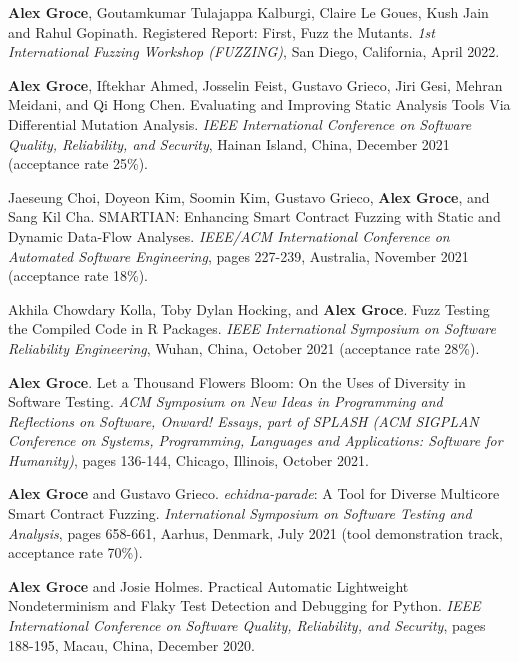 \documentclass[ComputerScience]{vita}
\begin{document}
\begin{vita}
\begin{Refereed Conference and Workshop Publications}
\item {\bf Alex Groce}, Goutamkumar
  Tulajappa Kalburgi, Claire Le Goues, Kush Jain and Rahul Gopinath.
  \newblock Registered Report: First, Fuzz the Mutants.
  \newblock \emph{1st International Fuzzing Workshop (FUZZING)}, San Diego, California, April 2022.

\item {\bf Alex Groce}, Iftekhar Ahmed, Josselin Feist, Gustavo
  Grieco, Jiri Gesi, Mehran Meidani, and Qi Hong Chen.
  \newblock Evaluating and Improving Static Analysis Tools Via
  Differential Mutation Analysis.
  \newblock \emph{IEEE International Conference on Software
Quality, Reliability, and Security}, Hainan
Island, China, December 2021 (acceptance rate 25\%).
  
\item Jaeseung Choi, Doyeon Kim, Soomin Kim, Gustavo Grieco, {\bf Alex Groce}, and Sang Kil Cha.
\newblock SMARTIAN: Enhancing Smart Contract Fuzzing with Static and Dynamic Data-Flow Analyses.
\newblock \emph{IEEE/ACM International Conference on Automated Software
  Engineering}, pages 227-239, Australia, November 2021 (acceptance rate 18\%).

\item Akhila Chowdary Kolla, Toby Dylan Hocking, and {\bf Alex Groce}.
\newblock Fuzz Testing the Compiled Code in R Packages.
\newblock \emph{IEEE International Symposium on Software Reliability Engineering}, Wuhan, China, October 2021 (acceptance rate 28\%).

\item
{\bf Alex Groce}.
\newblock Let a Thousand Flowers Bloom: On the Uses of Diversity in Software Testing.
\newblock \emph{ACM Symposium on New Ideas in Programming and
  Reflections on Software, Onward! Essays, part of SPLASH (ACM SIGPLAN
  Conference on Systems, Programming, Languages and Applications:
  Software for Humanity)}, pages 136-144, Chicago, Illinois, October 2021.

\item {\bf Alex Groce} and Gustavo Grieco.
  \newblock \emph{echidna-parade}: A Tool for Diverse Multicore Smart Contract Fuzzing.
  \newblock \emph{International Symposium on Software Testing and
  Analysis}, pages 658-661, Aarhus, Denmark, July
2021 (tool demonstration track, acceptance rate 70\%).
  
\item {\bf Alex Groce} and Josie Holmes.
\newblock Practical Automatic Lightweight Nondeterminism and
           Flaky Test Detection and Debugging for Python.
\newblock \emph{IEEE International Conference on Software
Quality, Reliability, and Security}, pages 188-195, Macau,
China, December 2020.
  

\end{Refereed Conference and Workshop Publications}
\end{vita}
\end{document}
